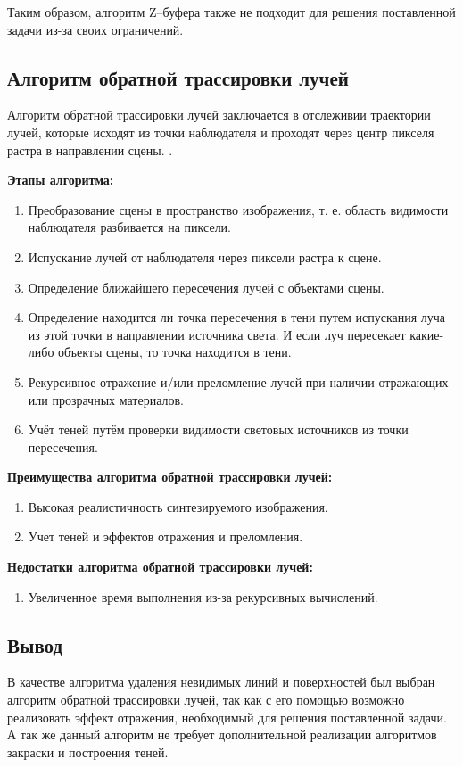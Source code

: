 Таким образом, алгоритм Z--буфера также не подходит для решения поставленной задачи из-за своих ограничений.

\subsection{Алгоритм обратной трассировки лучей}
Алгоритм обратной трассировки лучей заключается в отслеживии траектории лучей, которые исходят из точки наблюдателя и проходят через центр пикселя растра в направлении сцены. \cite{shikinDinamica}.

\textbf{Этапы алгоритма:}
\begin{enumerate}[label=\arabic*)]
	\item Преобразование сцены в пространство изображения, т. е. область видимости наблюдателя разбивается на пиксели.
	\item Испускание лучей от наблюдателя через пиксели растра к сцене.
	\item Определение ближайшего пересечения лучей с объектами сцены.
	\item Определение находится ли точка пересечения в тени путем испускания луча из этой точки в направлении источника света. И если луч пересекает какие-либо объекты сцены, то точка находится в тени.
	\item Рекурсивное отражение и/или преломление лучей при наличии отражающих или прозрачных материалов.
	\item Учёт теней путём проверки видимости световых источников из точки пересечения.
\end{enumerate}

\textbf{Преимущества алгоритма обратной трассировки лучей:}
\begin{enumerate}[label=\arabic*)]
	\item Высокая реалистичность синтезируемого изображения.
	\item Учет теней и эффектов отражения и преломления.
\end{enumerate}

\textbf{Недостатки алгоритма обратной трассировки лучей:}
\begin{enumerate}[label=\arabic*)]
	\item Увеличенное время выполнения из-за рекурсивных вычислений.
\end{enumerate}

\subsection*{Вывод}
В качестве алгоритма удаления невидимых линий и поверхностей был выбран алгоритм обратной трассировки лучей, так как с его помощью возможно реализовать эффект отражения, необходимый для решения поставленной задачи. А так же данный алгоритм не требует дополнительной реализации алгоритмов закраски и построения теней.

